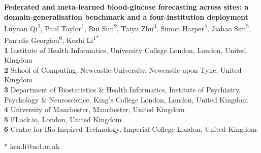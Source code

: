 \documentclass[10pt,letterpaper]{article}
\begin{document}
\vspace*{0.2in}

\begin{flushleft}
{\Large
\textbf{Federated and meta-learned blood-glucose forecasting across sites: a domain-generalisation benchmark and a four-institution deployment}
}
\newline
\\
Luyuan Qi\textsuperscript{1},
Paul Taylor\textsuperscript{1},
Rui Sun\textsuperscript{2},
Taiyu Zhu\textsuperscript{3},
Simon Harper\textsuperscript{4},
Jiahao Sun\textsuperscript{5},
Pantelis Georgiou\textsuperscript{6},
Kezhi Li\textsuperscript{1*}
\\
\bigskip
\textbf{1} Institute of Health Informatics, University College London, London, United Kingdom
\\
\textbf{2} School of Computing, Newcastle University, Newcastle upon Tyne, United Kingdom
\\
\textbf{3} Department of Biostatistics \& Health Informatics, Institute of Psychiatry, Psychology \& Neuroscience, King's College London, London, United Kingdom
\\
\textbf{4} University of Manchester, Manchester, United Kingdom
\\
\textbf{5} FLock.io, London, United Kingdom
\\
\textbf{6} Centre for Bio-Inspired Technology, Imperial College London, United Kingdom
\\
\bigskip

* ken.li@ucl.ac.uk

\end{flushleft}

\end{document}
